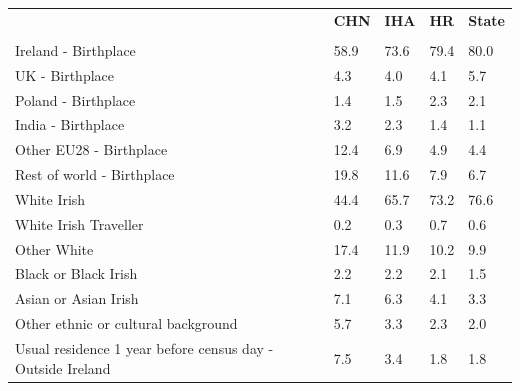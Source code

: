 \documentclass{article}
\begin{document}
\pagebreak
\begin{table}[h]	
\centering
		\begin{tabular}{KTTTT}
  \hline
& \textbf{CHN} & \textbf{IHA} & \textbf{HR}& \textbf{State}\\ 
  \hline
    \\ 
    \hline
Ireland - Birthplace & 58.9& 73.6& 79.4& 80.0\\
UK - Birthplace & 4.3& 4.0& 4.1& 5.7\\
Poland - Birthplace & 1.4& 1.5& 2.3& 2.1\\
India - Birthplace & 3.2& 2.3& 1.4& 1.1\\
Other EU28 - Birthplace & 12.4&  6.9&  4.9&  4.4\\
Rest of world - Birthplace & 19.8& 11.6&  7.9&  6.7\\
    \hline
White Irish & 44.4& 65.7& 73.2& 76.6\\
White Irish Traveller & 0.2& 0.3& 0.7& 0.6\\
Other White & 17.4& 11.9& 10.2&  9.9\\
Black or Black Irish & 2.2& 2.2& 2.1& 1.5\\
Asian or Asian Irish & 7.1& 6.3& 4.1& 3.3\\
Other ethnic or cultural background & 5.7& 3.3& 2.3& 2.0\\
    \hline
Usual residence 1 year before census day - Outside Ireland & 7.5& 3.4& 1.8& 1.8\\


\end{tabular}
\end{table}
\end{document}
